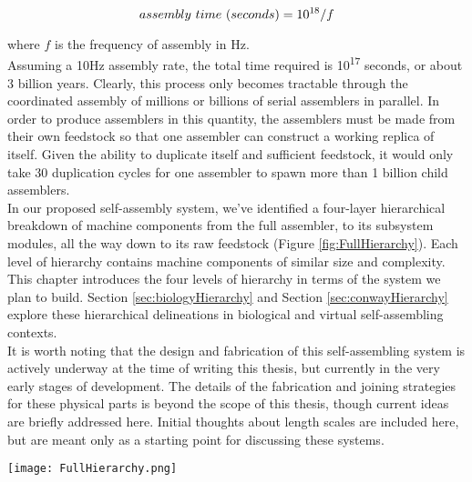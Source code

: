 {\[assembly\ time\ (seconds) = 10\textsuperscript{18}/f\]

where $f$ is the frequency of assembly in Hz.\\

Assuming a 10Hz assembly rate, the total time required is 10\textsuperscript{17} seconds, or about 3 billion years.  Clearly, this process only becomes tractable through the coordinated assembly of millions or billions of serial assemblers in parallel.  In order to produce assemblers in this quantity, the assemblers must be made from their own feedstock so that one assembler can construct a working replica of itself.  Given the ability to duplicate itself and sufficient feedstock, it would only take 30 duplication cycles for one assembler to spawn more than 1 billion child assemblers.\\

In our proposed self-assembly system, we've identified a four-layer hierarchical breakdown of machine components from the full assembler, to its subsystem modules, all the way down to its raw feedstock (Figure \ref{fig:FullHierarchy}).  Each level of hierarchy contains machine components of similar size and complexity.  This chapter introduces the four levels of hierarchy in terms of the system we plan to build.  Section \ref{sec:biologyHierarchy} and Section \ref{sec:conwayHierarchy} explore these hierarchical delineations in biological and virtual self-assembling contexts.\\ 

It is worth noting that the design and fabrication of this self-assembling system is actively underway at the time of writing this thesis, but currently in the very early stages of development.  The details of the fabrication and joining strategies for these physical parts is beyond the scope of this thesis, though current ideas are briefly addressed here.  Initial thoughts about length scales are included here, but are meant only as a starting point for discussing these systems.


\begin{sidewaysfigure}
 \texttt{[image: FullHierarchy.png]}
  \caption{Diagram of the hierarchical breakdown of robotic modules into functions and elements.  Examples of the geometric layout of elements to form functional primitives are indicated for a 1DOF bending flexure and a capacitor.  Images of fabricated functional parts are shown alongside their functional primitive decompositions.  More detailed views of the transition from elements to functional primitives and from functional primitives to functional parts are shown in Figures \ref{fig:Hierarchy-ElementsParts} and \ref{fig:Hierarchy-FunctionPrimitivesParts}.  \textit{Image Credit (for photos of fabricated functional parts): Will Langford 2016} }
  \label{fig:FullHierarchy}
\end{sidewaysfigure}

}
